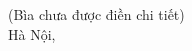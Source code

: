 \documentclass[DoAn.tex]{subfiles}
\begin{document}
\thispagestyle{empty}
\begin{center}
\vspace*{2cm}
{\Large \textbf{\TITLE}}\\[1cm]
{\large \textbf{\AUTHOR}}\\[2cm]
{\large (Bìa chưa được điền chi tiết)}\\
\vfill
Hà Nội, \the\year
\end{center}
\end{document}
